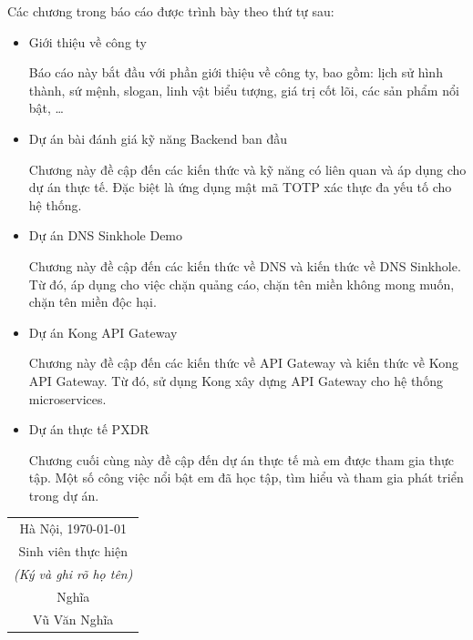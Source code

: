 Các chương trong báo cáo được trình bày theo thứ tự sau:

\vspace{0.5cm}

\begin{itemize}
\item
Giới thiệu về công ty

Báo cáo này bắt đầu với phần
giới thiệu về công ty,
bao gồm:
lịch sử hình thành,
sứ mệnh,
slogan,
linh vật biểu tượng,
giá trị cốt lõi,
các sản phẩm nổi bật, \dots

\item
Dự án bài đánh giá kỹ năng Backend ban đầu

Chương này đề cập đến
các kiến thức và kỹ năng
có liên quan và áp dụng cho dự án thực tế.
Đặc biệt là ứng dụng mật mã TOTP xác thực đa yếu tố cho hệ thống.

\item
Dự án DNS Sinkhole Demo

Chương này đề cập đến
các kiến thức về DNS
và kiến thức về DNS Sinkhole.
Từ đó,
áp dụng cho việc chặn quảng cáo,
chặn tên miền không mong muốn,
chặn tên miền độc hại.

\item
Dự án Kong API Gateway

Chương này đề cập đến
các kiến thức về API Gateway
và kiến thức về Kong API Gateway.
Từ đó,
sử dụng Kong
xây dựng
API Gateway
cho
hệ thống microservices.

\item
Dự án thực tế PXDR

Chương cuối cùng này đề cập đến
dự án thực tế
mà em được tham gia thực tập.
Một số công việc nổi bật
em đã học tập, tìm hiểu
và tham gia phát triển
trong dự án.

\end{itemize}


\begin{flushright}
\begin{tabular}{c}
Hà Nội, \today \\
Sinh viên thực hiện \\
\textit{(Ký và ghi rõ họ tên)} \\
Nghĩa \\
Vũ Văn Nghĩa
\end{tabular}
\end{flushright}
